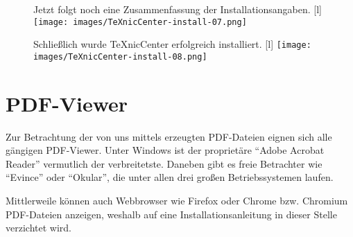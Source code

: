 \begin{figure}[thb]
	\begin{captionbeside}{%
			Jetzt folgt noch eine Zusammenfassung der Installationsangaben.%
			\label{fig:install26}}[l]
		\texttt{[image: images/TeXnicCenter-install-07.png]}
	\end{captionbeside}
\end{figure}

\begin{figure}[thb]
	\begin{captionbeside}{%
			Schließlich wurde TeXnicCenter erfolgreich installiert.%
			\label{fig:install27}}[l]
		\texttt{[image: images/TeXnicCenter-install-08.png]}
	\end{captionbeside}
\end{figure}


\clearpage %


\section{PDF-Viewer}

Zur Betrachtung der von uns mittels \DMLLaTeX{} erzeugten PDF-Dateien eignen sich alle gängigen PDF-Viewer. Unter Windows ist der proprietäre \enquote{Adobe Acrobat Reader} vermutlich der verbreitetste. Daneben gibt es freie Betrachter wie \enquote{Evince} oder \enquote{Okular}, die unter allen drei großen Betriebssystemen laufen. 

Mittlerweile können auch Webbrowser wie Firefox oder Chrome bzw. Chromium PDF-Dateien anzeigen, weshalb auf eine Installationsanleitung in dieser Stelle verzichtet wird.

